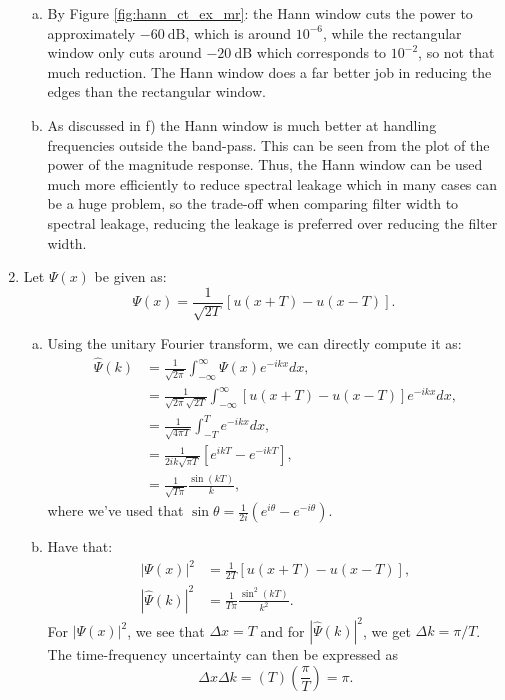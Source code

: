 \begin{enumerate}
\begin{enumerate}[a)]
\item By Figure \ref{fig:hann_ct_ex_mr}: the Hann window cuts the power to approximately $-60\ \text{dB}$, 
which is around $10^{-6}$, while the rectangular window only cuts around $-20\ \text{dB}$ which corresponds to $10^{-2}$, so not that much reduction. The Hann window does a far better job in reducing the edges than the rectangular window.

\item As discussed in f) the Hann window is much better at handling frequencies outside the band-pass. 
This can be seen from the plot of the power of the magnitude response. Thus, the Hann window can be used much more efficiently
 to reduce spectral leakage which in many cases can be a huge problem, so the trade-off when comparing filter width to spectral 
 leakage, reducing the leakage is preferred over reducing the filter width.


\end{enumerate}

\item Let $\Psi(x)$ be given as:
\begin{equation*}
\Psi(x) = \frac{1}{\sqrt{2T}}[u(x + T) - u(x - T)].
\end{equation*}

\begin{enumerate}[a)]
\item Using the unitary Fourier transform, we can directly compute it as:
\begin{align*}
    \hat{\Psi}(k) &= \frac{1}{\sqrt{2\pi}}\int_{-\infty}^{\infty}\Psi(x)e^{-ik x}dx, \\
            &= \frac{1}{\sqrt{2\pi}\sqrt{2T}}\int_{-\infty}^{\infty} [u(x + T) - u(x - T)]e^{-ik x}dx, \\
            &= \frac{1}{\sqrt{4\pi T}}\int_{-T}^{T}e^{-ik x}dx, \\
            &= \frac{1}{2ik\sqrt{\pi T}}[e^{ik T} - e^{-ik T}], \\
            &= \frac{1}{\sqrt{T\pi}}\frac{\sin(k T)}{k},
\end{align*}
where we've used that $\sin\theta = \frac{1}{2i}(e^{i\theta}-e^{-i\theta})$.

\item Have that:
\begin{align*}
    |\Psi(x)|^{2} &= \frac{1}{2T}[u(x+T) - u(x-T)], \\
    |\hat{\Psi}(k)|^{2} &= \frac{1}{T\pi}\frac{\sin^{2}(k T)}{k^{2}}.
\end{align*}
For $|\Psi(x)|^{2}$, we see that $\Delta x = T$ and for $|\hat{\Psi}(k)|^{2}$, we get $\Delta k =\pi/T$. The time-frequency uncertainty can then be expressed as
$$\Delta x\Delta k=(T)\left(\frac{\pi}{T}\right)=\pi.$$


\end{enumerate}
\end{enumerate}
